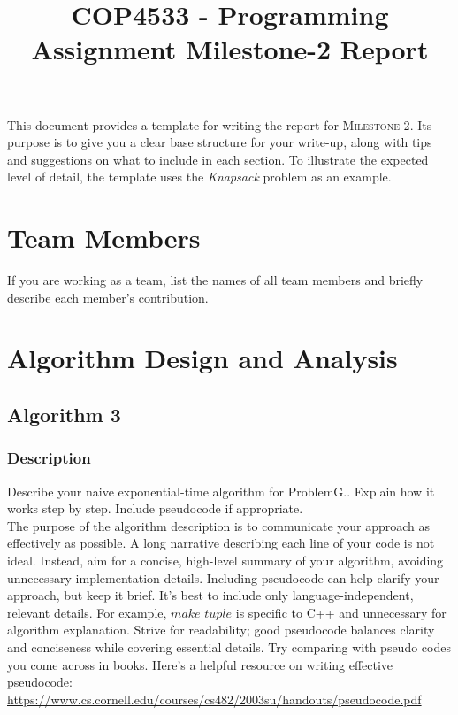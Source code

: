 \documentclass{article}
\begin{document}
\title{COP4533 - Programming Assignment Milestone-2 Report}
\date{}
\maketitle
{\color{red}
This document provides a template for writing the report for \textsc{Milestone-2}.  
Its purpose is to give you a clear base structure for your write-up, along with tips and suggestions on what to include in each section.  
To illustrate the expected level of detail, the template uses the \textit{Knapsack} problem as an example. 
}

\section{Team Members}
{\color{red} If you are working as a team, list the names of all team members and briefly describe each member's contribution.}

\section{Algorithm Design and Analysis}

\subsection{Algorithm 3}

\subsubsection{Description}
{\color{red} Describe your naive exponential-time algorithm for ProblemG.. Explain how it works step by step. Include pseudocode if appropriate.\\

The purpose of the algorithm description is to communicate your approach as effectively as possible. A long narrative describing each line of your code is not ideal. Instead, aim for a concise, high-level summary of your algorithm, avoiding unnecessary implementation details. Including pseudocode can help clarify your approach, but keep it brief. It’s best to include only language-independent, relevant details. For example, $make\_tuple$ is specific to C++ and unnecessary for algorithm explanation. Strive for readability; good pseudocode balances clarity and conciseness while covering essential details. Try comparing with pseudo codes you come across in books. Here’s a helpful resource on writing effective pseudocode: 
 \url{https://www.cs.cornell.edu/courses/cs482/2003su/handouts/pseudocode.pdf}
}
\end{document}
